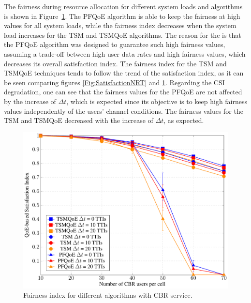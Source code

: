 \documentclass[12pt]{article}
\newcommand{\FigRef}[1]{Figure~\ref{#1}}
\begin{document}
The fairness during resource allocation for different system loads and algorithms is shown in \FigRef{Fig:FairnessNRT}. The PFQoE algorithm is able to keep the fairness at high values for all system loads, while the fairness index decreases when the system load increases for the TSM and TSMQoE algorithms. The reason for the is that the PFQoE algorithm was designed to guarantee such high fairness values, assuming a trade-off between high user data rates and high fairness values, which decreases its overall satisfaction index. The fairness index for the TSM and TSMQoE techniques tends to follow the trend of the satisfaction index, as it can be seen comparing figures \ref{Fig:SatisfactionNRT} and \ref{Fig:FairnessNRT}. Regarding the CSI degradation, one can see that the fairness values for the PFQoE are not affected by the increase of $\Delta t$, which is expected since its objective is to keep high fairness values independently of the users' channel conditions. The fairness values for the TSM and TSMQoE decreased with the increase of $\Delta t$, as expected.

\begin{figure}[!hb]
	\centering
	\includegraphics[width=0.55\linewidth,page=2]{figs_wp2/figs_BRUNO_PEDRO/NRT}
	\caption{Fairness index for different algorithms with CBR service.}
	\label{Fig:FairnessNRT}
\end{figure}

\end{document}
